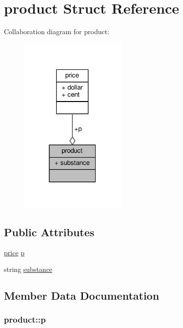 \hypertarget{structproduct}{}\section{product Struct Reference}
\label{structproduct}


Collaboration diagram for product\+:
\nopagebreak
\begin{figure}[H]
\begin{center}
\leavevmode
\includegraphics[width=151pt]{structproduct__coll__graph}
\end{center}
\end{figure}
\subsection*{Public Attributes}
\begin{DoxyCompactItemize}
\item 
\hyperlink{structprice}{price} \hyperlink{structproduct_a4987f39c16924c6ef80d5d6055fcc265}{p}
\item 
string \hyperlink{structproduct_a9419ebf0b7d9d0e00ffc4ea9df510fb4}{substance}
\end{DoxyCompactItemize}


\subsection{Member Data Documentation}
\subsubsection[{\texorpdfstring{p}{p}}]{ product\+::p}\hypertarget{structproduct_a4987f39c16924c6ef80d5d6055fcc265}{}\label{structproduct_a4987f39c16924c6ef80d5d6055fcc265}
